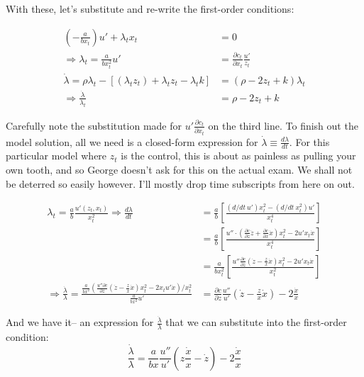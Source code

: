 \documentclass[
]{article}
\begin{document}
With these, let's substitute and re-write the first-order conditions:

\begin{align}
\left( -\frac{a}{bx_t}\right)u' + \lambda_tx_t &= 0 \\
\Rightarrow \lambda_t = \frac{a}{bx_t^2}u' &= \frac{\partial c_t}{\partial x_t}\frac{u'}{z_t} \\
\dot{\lambda} = \rho \lambda_t - \left[ (\lambda_t z_t) + \lambda_t z_t - \lambda_t k \right] &= (\rho - 2z_t + k)\lambda_t \\
\Rightarrow \frac{\dot{\lambda}}{\lambda_t} &= \rho - 2z_t + k

\end{align}

Carefully note the substitution made for
\(u'\frac{\partial c_t}{\partial x_t}\) on the third line. To finish out
the model solution, all we need is a closed-form expression for
\(\dot{\lambda} \equiv \frac{d\lambda}{dt}\). For this particular model
where \(z_t\) is the control, this is about as painless as pulling your
own tooth, and so George doesn't ask for this on the actual exam. We
shall not be deterred so easily however. I'll mostly drop time
subscripts from here on out.

\begin{align}

\lambda_t = \frac{a}{b}\frac{u'(z_t , x_t)}{x_t^2} \Rightarrow \frac{d\lambda}{dt} &= \frac{a}{b}\left[\frac{(d/dt \ u')x_t^2 - (d/dt \ x_t^2)u'}{x_t^4}\right] \\
&= \frac{a}{b}\left[\frac{u''\cdot(\frac{\partial c}{\partial z}\dot{z} + \frac{\partial c}{\partial x}\dot{x})x_t^2 - 2u'x_t\dot{x}}{x_t^4} \right] \\ 
&= \frac{a}{bx_t^2}\left[\frac{u''\frac{\partial c}{\partial z}(\dot{z} - \frac{z}{x}\dot{x})x_t^2 - 2u'x_t\dot{x}}{x_t^2} \right] \\
\Rightarrow \frac{\dot{\lambda}}{\lambda} = \frac{\frac{a}{bx^2}(\frac{u''\partial c}{\partial z}(\dot{z} - \frac{z}{x}\dot{x})x_t^2 - 2x_tu'\dot{x})/x_t^2}{\frac{a}{bx^2}u'} &= \frac{\partial c}{\partial z}\frac{u''}{u'}(\dot{z} - \frac{z}{x}\dot{x}) - 2\frac{\dot{x}}{x}

\end{align}

And we have it-- an expression for \(\frac{\dot{\lambda}}{\lambda}\)
that we can substitute into the first-order condition:
\[ \frac{\dot{\lambda}}{\lambda} = \frac{a}{bx}\frac{u''}{u'}\left(z\frac{\dot{x}}{x} - \dot{z}\right) - 2\frac{\dot{x}}{x} \]
\end{document}
